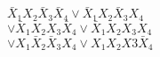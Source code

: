 \documentclass[preview]{standalone}
\begin{document}
\begin{center}
${\bar X_{1} X_{2} \bar X_{3} \bar X_{4} \lor \bar X_{1} X_{2} \bar X_{3} X_{4}}$ \\ ${\lor \bar X_{1} X_{2} X_{3} \bar X_{4} \lor \bar X_{1} X_{2} X_{3} X_{4}}$ \\ ${\lor X_{1} \bar X_{2} \bar X_{3} X_{4} \lor X_{1} X_{2} X{3} \bar X_{4}}$
\end{center}
\end{document}
